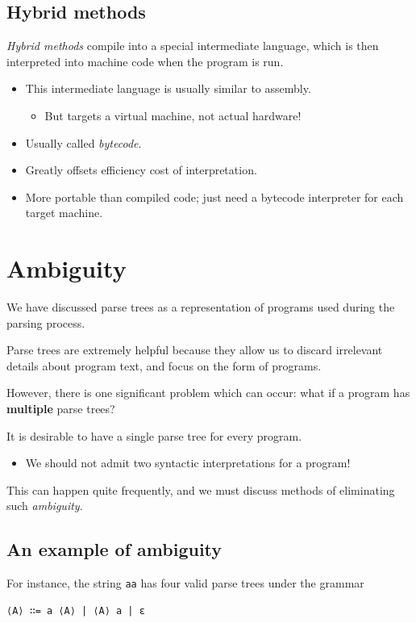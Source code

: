 \documentclass[11pt]{article}
\theoremstyle{definition}
\begin{document}
\subsection{Hybrid methods}
\label{sec:org84b5fad}
\emph{Hybrid methods} compile into a special intermediate language,
which is then interpreted into machine code when the program is run.
\begin{itemize}
\item This intermediate language is usually similar to assembly.
\begin{itemize}
\item But targets a virtual machine, not actual hardware!
\end{itemize}
\item Usually called \emph{bytecode}.
\item Greatly offsets efficiency cost of interpretation.
\item More portable than compiled code; just need
a bytecode interpreter for each target machine.
\end{itemize}

\section{Ambiguity}
\label{sec:orgb18678b}
We have discussed parse trees as a representation
of programs used during the parsing process.

Parse trees are extremely helpful because they allow us
to discard irrelevant details about program text,
and focus on the form of programs.

However, there is one significant problem which can occur:
what if a program has \textbf{multiple} parse trees?

It is desirable to have a single parse tree for every program.
\begin{itemize}
\item We should not admit two syntactic interpretations for a program!
\end{itemize}

This can happen quite frequently, and we must discuss
methods of eliminating such \emph{ambiguity}.

\subsection{An example of ambiguity}
\label{sec:org2241178}
For instance, the string \texttt{aa} has four valid parse trees
under the grammar
\begin{verbatim}
⟨A⟩ ∷= a ⟨A⟩ | ⟨A⟩ a | ε 
\end{verbatim}
\end{document}
